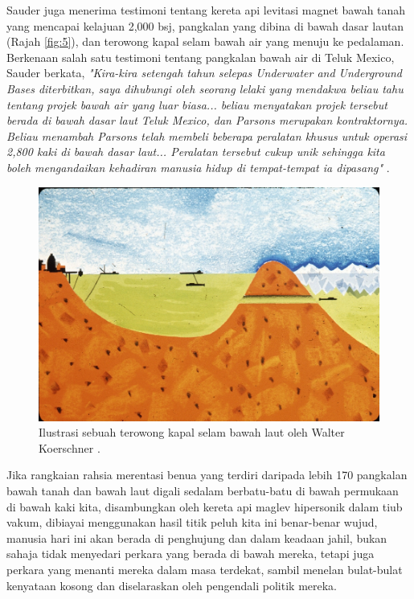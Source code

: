 \documentclass[10pt,twocolumn,letterpaper]{article}
\begin{document}
Sauder juga menerima testimoni tentang kereta api levitasi magnet bawah tanah yang mencapai kelajuan 2,000 bsj, pangkalan yang dibina di bawah dasar lautan (Rajah \ref{fig:5}), dan terowong kapal selam bawah air yang menuju ke pedalaman. Berkenaan salah satu testimoni tentang pangkalan bawah air di Teluk Mexico, Sauder berkata, \textit{"Kira-kira setengah tahun selepas Underwater and Underground Bases diterbitkan, saya dihubungi oleh seorang lelaki yang mendakwa beliau tahu tentang projek bawah air yang luar biasa... beliau menyatakan projek tersebut berada di bawah dasar laut Teluk Mexico, dan Parsons merupakan kontraktornya. Beliau menambah Parsons telah membeli beberapa peralatan khusus untuk operasi 2,800 kaki di bawah dasar laut... Peralatan tersebut cukup unik sehingga kita boleh mengandaikan kehadiran manusia hidup di tempat-tempat ia dipasang"} \cite{22}.
\begin{figure}[t]
\begin{center}
   \includegraphics[width=1\linewidth]{sub.jpg}
\end{center}
   \caption{Ilustrasi sebuah terowong kapal selam bawah laut oleh Walter Koerschner \cite{22,23}.}
\label{fig:6}
\label{fig:onecol}
\end{figure}

Jika rangkaian rahsia merentasi benua yang terdiri daripada lebih 170 pangkalan bawah tanah dan bawah laut digali sedalam berbatu-batu di bawah permukaan di bawah kaki kita, disambungkan oleh kereta api maglev hipersonik dalam tiub vakum, dibiayai menggunakan hasil titik peluh kita ini benar-benar wujud, manusia hari ini akan berada di penghujung dan dalam keadaan jahil, bukan sahaja tidak menyedari perkara yang berada di bawah mereka, tetapi juga perkara yang menanti mereka dalam masa terdekat, sambil menelan bulat-bulat kenyataan kosong dan diselaraskan oleh pengendali politik mereka.
\end{document}
